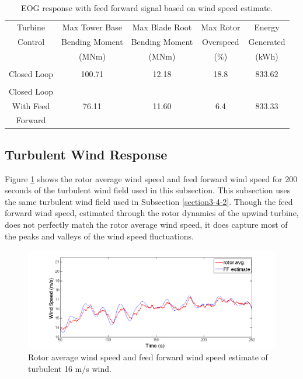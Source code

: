 \begin{table}
\centering
\begin{tabular}{ c | c c c c }
\hline
\hline
Turbine			& Max Tower	Base		& Max Blade	Root		& Max Rotor				& Energy\\
Control			& Bending Moment		& Bending Moment		& Overspeed					& Generated\\
						& (MNm)  				& (MNm)				& ($\%$)	& (kWh)\\

\hline
  &  &   &  &  \\
Closed Loop  & 100.71 & 12.18  &18.8 & 833.62 \\
 &  &   &  & \\
Closed Loop  &  &   &  &  \\
With Feed  & 76.11 & 11.60  & 6.4 & 833.33 \\
Forward  &  &   &  &  \\
\hline
\hline
\end{tabular}
\caption{EOG response with feed forward signal based on wind speed estimate.}
\label{Table3-4}
\end{table}

\FloatBarrier
\subsection{Turbulent Wind Response} \label{section3-5-2}
Figure \ref{fig3-30} shows the rotor average wind speed and feed forward wind speed for 200 seconds of the turbulent wind field used in this subsection. This subsection uses the same turbulent wind field used in Subsection \ref{section3-4-2}. Though the feed forward wind speed, estimated through the rotor dynamics of the upwind turbine, does not perfectly match the rotor average wind speed, it does capture most of the peaks and valleys of the wind speed fluctuations. 

\begin{figure}[htb]
	\centering
		\includegraphics[width = \linewidth]{Figures/ch3Figures/fig3-30.png}
		
	\caption{Rotor average wind speed and feed forward wind speed estimate of turbulent 16 m/s wind.}
	\label{fig3-30}
\end{figure}

